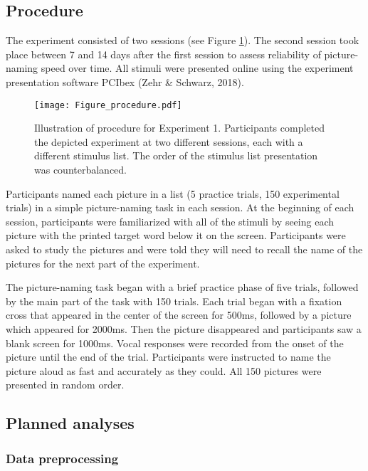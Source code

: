 \documentclass[
  man,floatsintext]{apa6}
\begin{document}
\hypertarget{procedure}{%
\subsection{Procedure}\label{procedure}}

The experiment consisted of two sessions (see Figure \ref{fig:Fig_proc}). The second session took place between 7 and 14 days after the first session to assess reliability of picture-naming speed over time. All stimuli were presented online using the experiment presentation software PCIbex (Zehr \& Schwarz, 2018).

\begin{figure}
  \centering
    \texttt{[image: Figure\_procedure.pdf]}
  \caption{Illustration of procedure for Experiment 1. Participants completed the depicted experiment at two different sessions, each with a different stimulus list. The order of the stimulus list presentation was counterbalanced.}
  \label{fig:Fig_proc}
\end{figure}

Participants named each picture in a list (5 practice trials, 150 experimental trials) in a simple picture-naming task in each session. At the beginning of each session, participants were familiarized with all of the stimuli by seeing each picture with the printed target word below it on the screen. Participants were asked to study the pictures and were told they will need to recall the name of the pictures for the next part of the experiment.

The picture-naming task began with a brief practice phase of five trials, followed by the main part of the task with 150 trials. Each trial began with a fixation cross that appeared in the center of the screen for 500ms, followed by a picture which appeared for 2000ms. Then the picture disappeared and participants saw a blank screen for 1000ms. Vocal responses were recorded from the onset of the picture until the end of the trial. Participants were instructed to name the picture aloud as fast and accurately as they could. All 150 pictures were presented in random order.

\hypertarget{planned-analyses}{%
\subsection{Planned analyses}\label{planned-analyses}}

\hypertarget{data-preprocessing}{%
\subsubsection{Data preprocessing}\label{data-preprocessing}}
\end{document}
